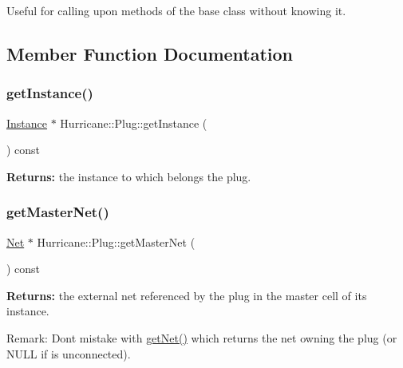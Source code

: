 Useful for calling upon methods of the base class without knowing it. 

\subsection{Member Function Documentation}
\mbox{\label{classHurricane_1_1Plug_a6ed1a11f86fbb80afacc9cc31b18a706}} 
\subsubsection{\texorpdfstring{get\+Instance()}{getInstance()}}
{\footnotesize\ttfamily \hyperlink{classHurricane_1_1Instance}{Instance} $\ast$ Hurricane\+::\+Plug\+::get\+Instance (\begin{DoxyParamCaption}{ }\end{DoxyParamCaption}) const\hspace{0.3cm}{\ttfamily [inline]}}

{\bfseries Returns\+:} the instance to which belongs the plug. \mbox{\label{classHurricane_1_1Plug_a57860e49d2674dcef6ea27d79c9d2ad8}} 
\subsubsection{\texorpdfstring{get\+Master\+Net()}{getMasterNet()}}
{\footnotesize\ttfamily \hyperlink{classHurricane_1_1Net}{Net} $\ast$ Hurricane\+::\+Plug\+::get\+Master\+Net (\begin{DoxyParamCaption}{ }\end{DoxyParamCaption}) const\hspace{0.3cm}{\ttfamily [inline]}}

{\bfseries Returns\+:} the external net referenced by the plug in the master cell of its instance.

\begin{DoxyParagraph}{Remark\+:}
Don\textquotesingle{}t mistake with \hyperlink{classHurricane_1_1Component_a1556ef77d6b89bfc17698d52ebde9791}{get\+Net()} which returns the net owning the plug (or N\+U\+LL if is unconnected). 
\end{DoxyParagraph}


